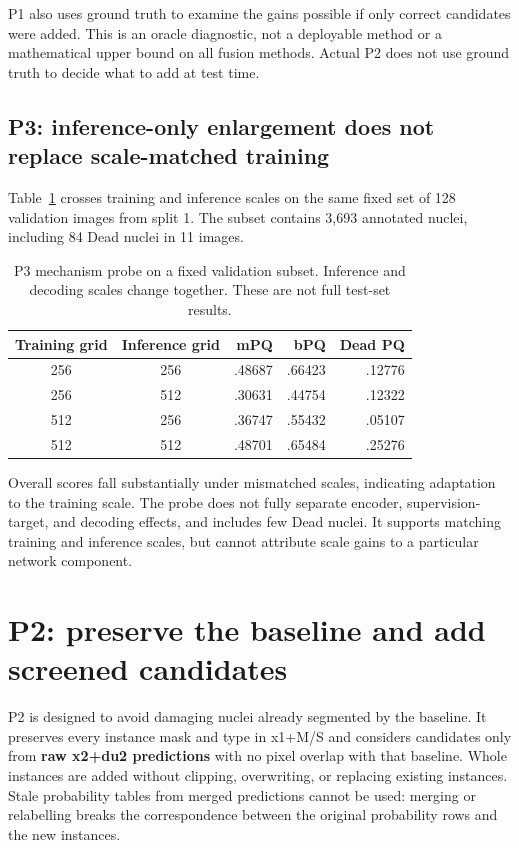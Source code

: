\documentclass[11pt,a4paper]{article}
\begin{document}
P1 also uses ground truth to examine the gains possible if only correct candidates were added. This is an oracle diagnostic, not a deployable method or a mathematical upper bound on all fusion methods. Actual P2 does not use ground truth to decide what to add at test time.

\subsection{P3: inference-only enlargement does not replace scale-matched training}

Table~\ref{tab:p3} crosses training and inference scales on the same fixed set of 128 validation images from split 1. The subset contains 3,693 annotated nuclei, including 84 Dead nuclei in 11 images.

\begin{table}[H]
\centering\small
\caption{P3 mechanism probe on a fixed validation subset. Inference and decoding scales change together. These are not full test-set results.}
\label{tab:p3}
\begin{tabular}{ccrrr}\toprule
Training grid & Inference grid & mPQ & bPQ & Dead PQ\\\midrule
256 & 256 & .48687 & .66423 & .12776\\
256 & 512 & .30631 & .44754 & .12322\\
512 & 256 & .36747 & .55432 & .05107\\
512 & 512 & .48701 & .65484 & .25276\\\bottomrule
\end{tabular}
\end{table}

Overall scores fall substantially under mismatched scales, indicating adaptation to the training scale. The probe does not fully separate encoder, supervision-target, and decoding effects, and includes few Dead nuclei. It supports matching training and inference scales, but cannot attribute scale gains to a particular network component.

\section{P2: preserve the baseline and add screened candidates}

P2 is designed to avoid damaging nuclei already segmented by the baseline. It preserves every instance mask and type in x1+M/S and considers candidates only from \textbf{raw x2+du2 predictions} with no pixel overlap with that baseline. Whole instances are added without clipping, overwriting, or replacing existing instances. Stale probability tables from merged predictions cannot be used: merging or relabelling breaks the correspondence between the original probability rows and the new instances.
\end{document}
